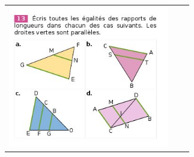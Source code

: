 \documentclass[12pt, twoside]{article}
\begin{document}
\begin{landscape}
\begin{tabular}{ccc}
\begin{minipage}{8cm}
\enskip

\includegraphics[width=7cm]{images/ex13.jpg}
\end{minipage}
\end{tabular}

\end{landscape}
\end{document}
